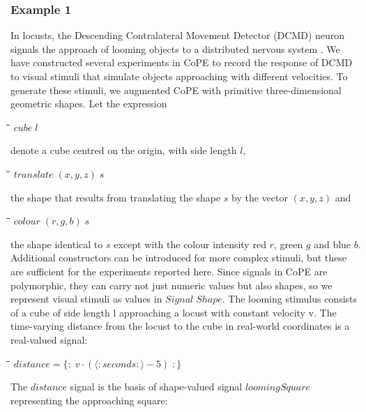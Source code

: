 \documentclass[11pt]{article}
\newlength{\lwidth}\setlength{\lwidth}{4.5cm}
\newlength{\cwidth}\setlength{\cwidth}{8mm} %
\newcommand{\Conid}[1]{\mathit{#1}}
\newcommand{\Varid}[1]{\mathit{#1}}
\begin{document}
\subsubsection*{Example 1}

In locusts, the Descending Contralateral Movement Detector (DCMD)
neuron signals the approach of looming objects to a distributed
nervous system \citep{Rind1992}. We have constructed several
experiments in CoPE to record the response of DCMD to visual stimuli
that simulate objects approaching with different velocities. To
generate these stimuli, we augmented CoPE with primitive
three-dimensional geometric shapes. Let the expression
\begin{tabbing}
\qquad\=\hspace{\lwidth}\=\hspace{\cwidth}\=\+\kill
${\Varid{cube}\;\Varid{l}}$
\end{tabbing}denote a cube centred on the origin, with side length \ensuremath{\Varid{l}},
\begin{tabbing}
\qquad\=\hspace{\lwidth}\=\hspace{\cwidth}\=\+\kill
${\Varid{translate}\;(\Varid{x},\Varid{y},\Varid{z})\;\Varid{s}}$
\end{tabbing}the shape that results from translating the shape \ensuremath{\Varid{s}} by the
vector \ensuremath{(\Varid{x},\Varid{y},\Varid{z})} and
\begin{tabbing}
\qquad\=\hspace{\lwidth}\=\hspace{\cwidth}\=\+\kill
${\Varid{colour}\;(\Varid{r},\Varid{g},\Varid{b})\;\Varid{s}}$
\end{tabbing}the shape identical to \ensuremath{\Varid{s}} except with the colour intensity red \ensuremath{\Varid{r}},
green \ensuremath{\Varid{g}} and blue \ensuremath{\Varid{b}}. Additional constructors can be introduced for
more complex stimuli, but these are sufficient for the experiments
reported here. Since signals in CoPE are polymorphic, they can carry not just
numeric values but also shapes, so we represent visual stimuli as
values in \ensuremath{\Conid{Signal}\;\Conid{Shape}}. The looming stimulus consists of a cube of
side length l approaching a locust with constant velocity v. The
time-varying distance from the locust to the cube in real-world
coordinates is a real-valued signal:
\begin{tabbing}
\qquad\=\hspace{\lwidth}\=\hspace{\cwidth}\=\+\kill
${\Varid{distance}\mathrel{=}\{\!:\!\;\Varid{v}\!\cdot\!(\langle:\Varid{seconds}:\rangle\mathbin{-}\mathrm{5})\;\!:\!\}}$
\end{tabbing}
The \ensuremath{\Varid{distance}} signal is the basis of shape-valued signal
\ensuremath{\Varid{loomingSquare}} representing the approaching square:
\end{document}

